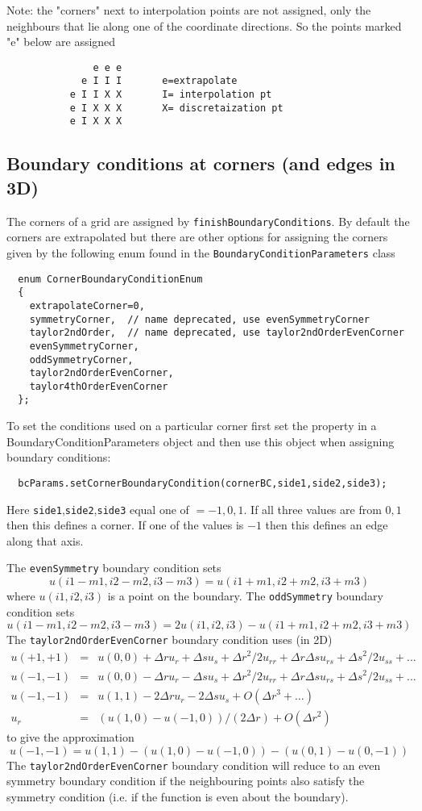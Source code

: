 Note: the "corners" next to interpolation points are not assigned, only
the neighbours that lie along one of the coordinate directions. So the
points marked "e" below are assigned
\begin{verbatim}
               e e e
             e I I I       e=extrapolate
           e I I X X       I= interpolation pt
           e I X X X       X= discretaization pt
           e I X X X
\end{verbatim}


\subsection{Boundary conditions at corners (and edges in 3D)}

The corners of a grid are assigned by {\tt finishBoundaryConditions}.
 By default the corners are extrapolated but there
are other options for assigning the corners given by the following enum found in the
{\tt BoundaryConditionParameters} class
\begin{verbatim}
  enum CornerBoundaryConditionEnum
  {
    extrapolateCorner=0,
    symmetryCorner,  // name deprecated, use evenSymmetryCorner
    taylor2ndOrder,  // name deprecated, use taylor2ndOrderEvenCorner
    evenSymmetryCorner,
    oddSymmetryCorner,
    taylor2ndOrderEvenCorner,
    taylor4thOrderEvenCorner
  };
\end{verbatim}
To set the conditions used on a particular corner first set the property in a
BoundaryConditionParameters object and then use this object when assigning boundary conditions:
\begin{verbatim}
  bcParams.setCornerBoundaryCondition(cornerBC,side1,side2,side3);
\end{verbatim}
Here {\tt side1},{\tt side2},{\tt side3} equal one of $ = -1, 0, 1$. 
If all three values are from $0,1$ then this defines a corner.
If one of the values is $-1$ then this defines an edge along that axis. 

The {\tt evenSymmetry} boundary condition sets 
\[
  u(i1-m1,i2-m2,i3-m3)=u(i1+m1,i2+m2,i3+m3)
\]
where $u(i1,i2,i3)$ is a point on the boundary.
The {\tt oddSymmetry} boundary condition sets 
\[
  u(i1-m1,i2-m2,i3-m3)=2 u(i1,i2,i3)- u(i1+m1,i2+m2,i3+m3)
\]
The {\tt taylor2ndOrderEvenCorner} boundary condition uses (in 2D)
\begin{eqnarray*}
  u(+1,+1) &=& u(0,0) +{\Delta r} u_r + {\Delta s} u_s + {\Delta r}^2/2 u_{rr} + {\Delta r} {\Delta s} u_{rs} + {\Delta s}^2/2 u_{ss} + \ldots \\
  u(-1,-1) &=& u(0,0) -{\Delta r} u_r - {\Delta s} u_s + {\Delta r}^2/2 u_{rr} + {\Delta r} {\Delta s} u_{rs} + {\Delta s}^2/2 u_{ss} + \ldots \\
  u(-1,-1) &=& u(1,1) -2 {\Delta r} u_r -2 {\Delta s} u_s + O({\Delta r}^3+ \ldots) \\
  u_r &=& (u(1,0)-u(-1,0))/(2 {\Delta r}) + O({\Delta r}^2)
\end{eqnarray*}
to give the approximation
\[
   u(-1,-1) = u(1,1) -( u(1,0)-u(-1,0) ) - (u(0,1)-u(0,-1))
\]
The {\tt taylor2ndOrderEvenCorner} boundary condition will reduce to an even symmetry boundary condition
if the neighbouring points also satisfy the symmetry condition (i.e. if the function is even about the boundary).

